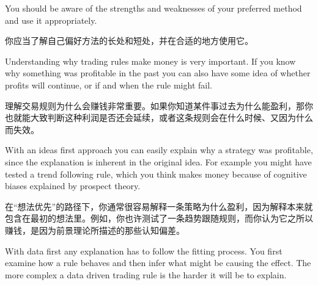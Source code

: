 \bipairgap

\begin{englishblock} You should be aware of the strengths and weaknesses of your preferred method and use it appropriately. \end{englishblock}

\begin{chineseblock}你应当了解自己偏好方法的长处和短处，并在合适的地方使用它。\end{chineseblock}


\begin{englishblock} Understanding why trading rules make money is very important. If you know why something was profitable in the past you can also have some idea of whether profits will continue, or if and when the rule might fail. \end{englishblock}

\begin{chineseblock}理解交易规则为什么会赚钱非常重要。如果你知道某件事过去为什么能盈利，那你也就能大致判断这种利润是否还会延续，或者这条规则会在什么时候、又因为什么而失效。\end{chineseblock}

\bipairgap

\begin{englishblock} With an ideas first approach you can easily explain why a strategy was profitable, since the explanation is inherent in the original idea. For example you might have tested a trend following rule, which you think makes money because of cognitive biases explained by prospect theory. \end{englishblock}

\begin{chineseblock}在“想法优先”的路径下，你通常很容易解释一条策略为什么盈利，因为解释本来就包含在最初的想法里。例如，你也许测试了一条趋势跟随规则，而你认为它之所以赚钱，是因为前景理论所描述的那些认知偏差。\end{chineseblock}

\bipairgap

\begin{englishblock} With data first any explanation has to follow the fitting process. You first examine how a rule behaves and then infer what might be causing the effect. The more complex a data driven trading rule is the harder it will be to explain. \end{englishblock}

